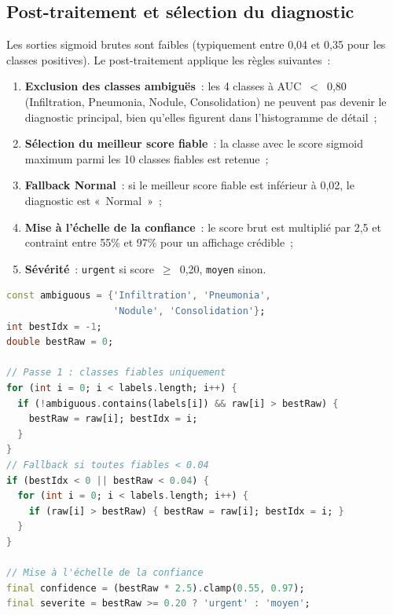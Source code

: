 \documentclass[12pt, a4paper]{report}
\begin{document}
\subsection{Post-traitement et sélection du diagnostic}

Les sorties sigmoid brutes sont faibles (typiquement entre 0,04 et 0,35 pour
les classes positives). Le post-traitement applique les règles suivantes~:

\begin{enumerate}
  \item \textbf{Exclusion des classes ambiguës}~: les 4 classes à AUC~$<$~0,80
        (Infiltration, Pneumonia, Nodule, Consolidation) ne peuvent pas devenir
        le diagnostic principal, bien qu'elles figurent dans l'histogramme de
        détail~;
  \item \textbf{Sélection du meilleur score fiable}~: la classe avec le score
        sigmoid maximum parmi les 10 classes fiables est retenue~;
  \item \textbf{Fallback Normal}~: si le meilleur score fiable est inférieur à
        0,02, le diagnostic est «~Normal~»~;
  \item \textbf{Mise à l'échelle de la confiance}~: le score brut est multiplié
        par 2,5 et contraint entre 55\% et 97\% pour un affichage crédible~;
  \item \textbf{Sévérité}~: \texttt{urgent} si score~$\geq$~0,20,
        \texttt{moyen} sinon.
\end{enumerate}

\begin{tcbox}[codebox, title={ai\_service.dart — sélection diagnostic}]
\begin{lstlisting}[language=Dart]
const ambiguous = {'Infiltration', 'Pneumonia',
                   'Nodule', 'Consolidation'};
int bestIdx = -1;
double bestRaw = 0;

// Passe 1 : classes fiables uniquement
for (int i = 0; i < labels.length; i++) {
  if (!ambiguous.contains(labels[i]) && raw[i] > bestRaw) {
    bestRaw = raw[i]; bestIdx = i;
  }
}
// Fallback si toutes fiables < 0.04
if (bestIdx < 0 || bestRaw < 0.04) {
  for (int i = 0; i < labels.length; i++) {
    if (raw[i] > bestRaw) { bestRaw = raw[i]; bestIdx = i; }
  }
}

// Mise à l'échelle de la confiance
final confidence = (bestRaw * 2.5).clamp(0.55, 0.97);
final severite = bestRaw >= 0.20 ? 'urgent' : 'moyen';
\end{lstlisting}
\end{tcbox}
\end{document}
